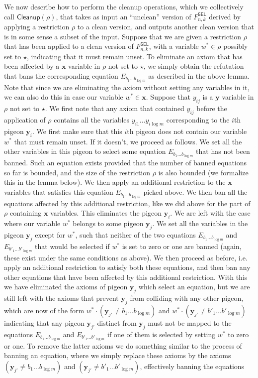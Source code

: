 \documentclass[10pt,a4paper]{article}
\begin{document}
We now describe how to perform the cleanup operations, which we collectively call $\mathsf{Cleanup}(\rho)$, that takes as input an ``unclean'' version of $F^{\mathsf{SEL}}_{n,k}$ derived by applying a restriction $\rho$ to a clean version, and outputs another clean version that is in some sense a subset of the input. Suppose that we are given a restriction $\rho$ that has been applied to a clean version of $F^{\mathsf{SEL}}_{n,k}$, with a variable $w^*\in\rho$ possibly set to $\star$, indicating that it must remain unset. To eliminate an axiom that has been affected by a $\mathbf x$ variable in $\rho$ not set to $\star$, we simply obtain the refutation that bans the corresponding equation $E_{b_1\ldots b_{\log m}}$ as described in the above lemma. Note that since we are eliminating the axiom without setting any variables in it, we can also do this in case our variable $w^*\in\mathbf x$. Suppose that $y_{ij}$ is a $\mathbf y$ variable in $\rho$ not set to $\star$. We first note that any axiom that contained $y_{ij}$ before the application of $\rho$ contains all the variables $y_{i1}\ldots y_{i\log m}$ corresponding to the $i$th pigeon $\mathbf y_i$. We first make sure that this $i$th pigeon does not contain our variable $w^*$ that must remain unset. If it doesn't, we proceed as follows. We set all the other variables in this pigeon to select some equation $E_{b_1\ldots b_{\log m}}$ that has not been banned. Such an equation exists provided that the number of banned equations so far is bounded, and the size of the restriction $\rho$ is also bounded (we formalize this in the lemma below). We then apply an additional restriction to the $\mathbf x$ variables that satisfies this equation $E_{b_1\ldots b_{\log m}}$ picked above. We then ban all the equations affected by this additional restriction, like we did above for the part of $\rho$ containing $\mathbf x$ variables. This eliminates the pigeon $\mathbf y_i$. We are left with the case where our variable $w^*$ belongs to some pigeon $\mathbf y_j$. We set all the variables in the pigeon $\mathbf y_j$ except for $w^*$, such that neither of the two equations $E_{b_1\ldots b_{\log m}}$ and $E_{b'_1\ldots b'_{\log m}}$ that would be selected if $w^*$ is set to zero or one are banned (again, these exist under the same conditions as above). We then proceed as before, i.e. apply an additional restriction to satisfy both these equations, and then ban any other equations that have been affected by this additional restriction. With this we have eliminated the axioms of pigeon $\mathbf y_j$ which select an equation, but we are still left with the axioms that prevent $\mathbf y_j$ from colliding with any other pigeon, which are now of the form $w^*\cdot(\mathbf y_{j'}\neq b_1\ldots b_{\log m})$ and $w^*\cdot(\mathbf y_{j'}\neq b'_1\ldots b'_{\log m})$ indicating that any pigeon $\mathbf y_{j'}$ distinct from $\mathbf y_j$ must not be mapped to the equations $E_{b_1\ldots b_{\log m}}$ and $E_{b'_1\ldots b'_{\log m}}$ if one of them is selected by setting $w^*$ to zero or one. To remove the latter axioms we do something similar to the process of banning an equation, where we simply replace these axioms by the axioms $(\mathbf y_{j'}\neq b_1\ldots b_{\log m})$ and $(\mathbf y_{j'}\neq b'_1\ldots b'_{\log m})$, effectively banning the equations 
\end{document}
